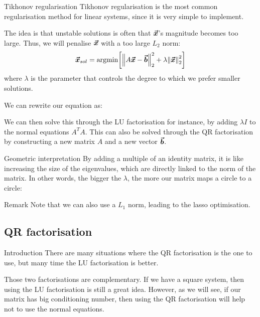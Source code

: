 \documentclass[a4paper]{article}
\begin{document}
\begin{parag}{Tikhonov regularisation}
    Tikhonov regularisation is the most common regularisation method for linear systems, since it is very simple to implement.

    The idea is that unstable solutions is often that $\bm{\protect\vec{x}}$'s magnitude becomes too large. Thus, we will penalise $\bm{\protect\vec{x}}$ with a too large $L_2$ norm: 
    \[\bvec{x}_{sol} = \argmin \left[\left\|A \bvec{x} - \bvec{b}\right\|_2^2 + \lambda \left\|\bvec{x}\right\|_2^2\right]\]
    where $\lambda$ is the parameter that controls the degree to which we prefer smaller solutions.

    We can rewrite our equation as:

    We can then solve this through the LU factorisation for instance, by adding $\lambda I$ to the normal equations $A^T A$. This can also be solved through the QR factorisation by constructing a new matrix $A$ and a new vector $\bm{\protect\vec{b}}$.
    
    \begin{subparag}{Geometric interpretation}
        By adding a multiple of an identity matrix, it is like increasing the size of the eigenvalues, which are directly linked to the norm of the matrix. In other words, the bigger the $\lambda$, the more our matrix maps a circle to a circle:

    \end{subparag}

    \begin{subparag}{Remark}
        Note that we can also use a $L_1$ norm, leading to the lasso optimisation.
    \end{subparag}
    
\end{parag}

\subsection{QR factorisation}
\begin{parag}{Introduction}
    There are many situations where the QR factorisation is the one to use, but many time the LU factorisation is better.

    Those two factorisations are complementary. If we have a square system, then using the LU factorisation is still a great idea. However, as we will see, if our matrix has big conditioning number, then using the QR factorisation will help not to use the normal equations.
\end{parag}
\end{document}
